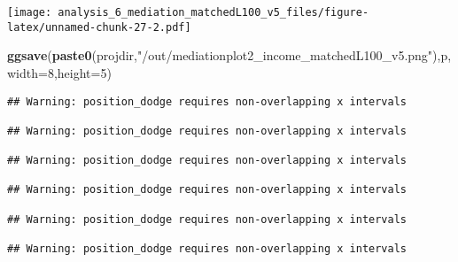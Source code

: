 \documentclass[
]{article}
\newenvironment{Shaded}{\begin{snugshade}}{\end{snugshade}}
\newcommand{\DataTypeTok}[1]{\textcolor[rgb]{0.13,0.29,0.53}{#1}}
\newcommand{\DecValTok}[1]{\textcolor[rgb]{0.00,0.00,0.81}{#1}}
\newcommand{\KeywordTok}[1]{\textcolor[rgb]{0.13,0.29,0.53}{\textbf{#1}}}
\newcommand{\NormalTok}[1]{#1}
\newcommand{\StringTok}[1]{\textcolor[rgb]{0.31,0.60,0.02}{#1}}
\begin{document}
\texttt{[image: analysis\_6\_mediation\_matchedL100\_v5\_files/figure-latex/unnamed-chunk-27-2.pdf]}

\begin{Shaded}
\begin{Highlighting}[]
\KeywordTok{ggsave}\NormalTok{(}\KeywordTok{paste0}\NormalTok{(projdir,}\StringTok{"/out/mediationplot2_income_matchedL100_v5.png"}\NormalTok{),p,}\DataTypeTok{width=}\DecValTok{8}\NormalTok{,}\DataTypeTok{height=}\DecValTok{5}\NormalTok{)}
\end{Highlighting}
\end{Shaded}

\begin{verbatim}
## Warning: position_dodge requires non-overlapping x intervals

## Warning: position_dodge requires non-overlapping x intervals

## Warning: position_dodge requires non-overlapping x intervals

## Warning: position_dodge requires non-overlapping x intervals

## Warning: position_dodge requires non-overlapping x intervals

## Warning: position_dodge requires non-overlapping x intervals
\end{verbatim}
\end{document}
